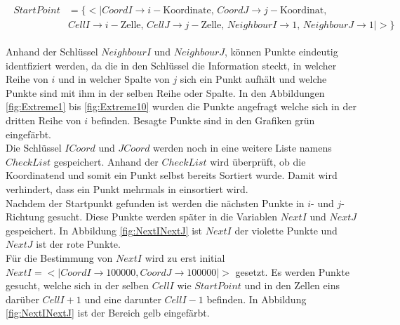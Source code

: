 \begin{gather*}
	\begin{split}
			StartPoint &= \{ <|CoordI \rightarrow i-\text{Koordinate},\, CoordJ \rightarrow j-\text{Koordinat},\, \\
			&CellI \rightarrow i-\text{Zelle},\, CellJ \rightarrow j-\text{Zelle},\,
			NeighbourI \rightarrow 1, \,NeighbourJ \rightarrow 1  |>\}
	\end{split}
\end{gather*}
 
Anhand der Schlüssel $NeighbourI$ und $NeighbourJ$, können Punkte eindeutig identfiziert werden, da die in den Schlüssel die Information steckt, in welcher Reihe von $i$ und in welcher Spalte von $j$ sich ein Punkt aufhält und welche Punkte sind mit ihm in der selben Reihe oder Spalte. In den Abbildungen \ref{fig:Extreme1} bis \ref{fig:Extreme10} wurden die Punkte angefragt welche sich in der dritten Reihe von $i$ befinden. Besagte Punkte sind in den Grafiken grün eingefärbt.\\

Die Schlüssel $ICoord$ und $JCoord$ werden noch in eine weitere Liste namens $CheckList$ gespeichert. Anhand der $CheckList$ wird überprüft, ob die Koordinatend und somit ein Punkt selbst bereits Sortiert wurde. Damit wird verhindert, dass ein Punkt mehrmals in einsortiert wird.\\
 
Nachdem der Startpunkt gefunden ist werden die nächsten Punkte in $i$- und $j$-Richtung gesucht. Diese Punkte werden später in die Variablen $NextI$ und $NextJ$ gespeichert. In Abbildung \ref{fig:NextINextJ} ist $NextI$ der violette Punkte und $NextJ$ ist der rote Punkte. \\

Für die Bestimmung von $NextI$ wird zu erst initial $NextI = <|CoordI \rightarrow 100 000, CoordJ \rightarrow 100 000|>$ gesetzt. Es werden Punkte gesucht, welche sich in der selben $CellI$ wie $StartPoint$ und in den Zellen eins darüber $CellI +1$ und eine darunter $CellI-1$ befinden. In Abbildung \ref{fig:NextINextJ} ist der Bereich gelb eingefärbt.\\


